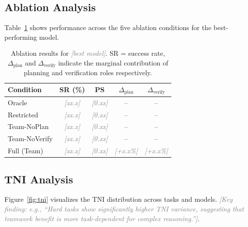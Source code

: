 \documentclass{article}
\newcommand{\tni}{\textsc{TNI}}
\newcommand{\placeholder}[1]{\textcolor{gray}{\textit{[#1]}}}
\begin{document}
\subsection{Ablation Analysis}
\label{sec:results:ablation}

Table~\ref{tab:ablation} shows performance across the five ablation conditions
for the best-performing model.

\begin{table}[h]
\centering
\caption{Ablation results for \placeholder{best model}. SR = success rate,
  $\Delta_{\text{plan}}$ and $\Delta_{\text{verify}}$ indicate the marginal
  contribution of planning and verification roles respectively.}
\label{tab:ablation}
\small
\begin{tabular}{lcccc}
\toprule
\textbf{Condition} & \textbf{SR (\%)} & \textbf{PS} & \textbf{$\Delta_{\text{plan}}$} & \textbf{$\Delta_{\text{verify}}$} \\
\midrule
Oracle          & \placeholder{xx.x} & \placeholder{0.xx} & --  & -- \\
Restricted      & \placeholder{xx.x} & \placeholder{0.xx} & --  & -- \\
Team-NoPlan     & \placeholder{xx.x} & \placeholder{0.xx} & --  & -- \\
Team-NoVerify   & \placeholder{xx.x} & \placeholder{0.xx} & --  & -- \\
Full (Team)     & \placeholder{xx.x} & \placeholder{0.xx} & \placeholder{+x.x\%} & \placeholder{+x.x\%} \\
\bottomrule
\end{tabular}
\end{table}

\subsection{TNI Analysis}
\label{sec:results:tni}

Figure~\ref{fig:tni} visualizes the \tni{} distribution across tasks and
models. \placeholder{Key finding: e.g., ``Hard tasks show significantly
higher \tni{} variance, suggesting that teamwork benefit is more
task-dependent for complex reasoning.''}.
\end{document}

